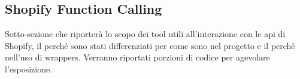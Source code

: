 \subsection{Shopify Function Calling}

Sotto-sezione che riporterà lo scopo dei tool utili all'interazione con le api di Shopify, il perché sono stati differenziati per come sono nel progetto e il perché nell'uso di wrappers.
Verranno riportati porzioni di codice per agevolare l'esposizione.